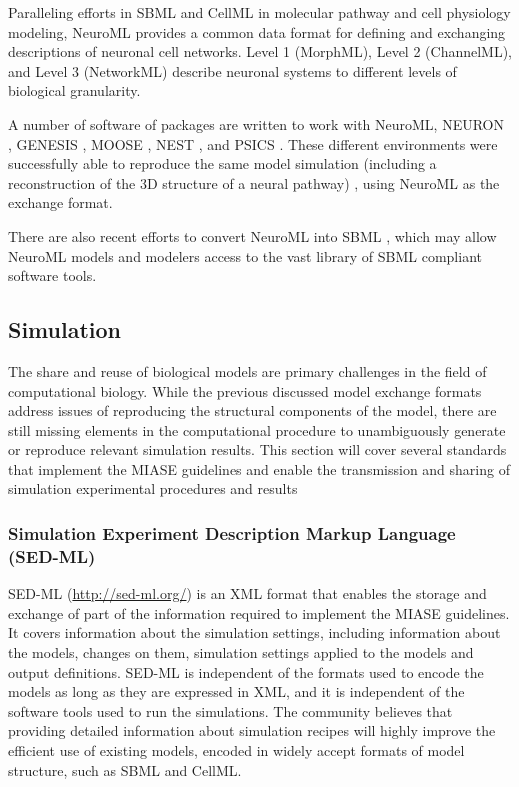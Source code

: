 \documentclass[]{article}
\begin{document}
Paralleling efforts in SBML and CellML in molecular pathway and cell
physiology modeling, NeuroML \autocite{goddard:2001} provides a common
data format for defining and exchanging descriptions of neuronal cell
networks. Level 1 (MorphML), Level 2 (ChannelML), and Level 3
(NetworkML) describe neuronal systems to different levels of biological
granularity.

A number of software of packages are written to work with NeuroML,
NEURON \autocite{carnevale2006neuron}, GENESIS \autocite{bower1995book},
MOOSE \autocite{ray2008pymoose}, NEST \autocite{diesmann2001nest}, and
PSICS \autocite{cannon2010stochastic}. These different environments were
successfully able to reproduce the same model simulation (including a
reconstruction of the 3D structure of a neural pathway)
\autocite{gleeson2010}, using NeuroML as the exchange format.

There are also recent efforts to convert NeuroML into SBML
\autocite{keating2012encoding}, which may allow NeuroML models and
modelers access to the vast library of SBML compliant software tools.

\subsection{Simulation}

The share and reuse of biological models are primary challenges in the
field of computational biology. While the previous discussed model
exchange formats address issues of reproducing the structural components
of the model, there are still missing elements in the computational
procedure to unambiguously generate or reproduce relevant simulation
results. This section will cover several standards that implement the
MIASE guidelines and enable the transmission and sharing of simulation
experimental procedures and results

\subsubsection{Simulation Experiment Description Markup Language
(SED-ML)}

SED-ML (\url{http://sed-ml.org/}) \autocite{kohn2008sed} is an XML
format that enables the storage and exchange of part of the information
required to implement the MIASE guidelines. It covers information about
the simulation settings, including information about the models, changes
on them, simulation settings applied to the models and output
definitions. SED-ML is independent of the formats used to encode the
models as long as they are expressed in XML, and it is independent of
the software tools used to run the simulations. The community believes
that providing detailed information about simulation recipes will highly
improve the efficient use of existing models, encoded in widely accept
formats of model structure, such as SBML and CellML.
\end{document}
